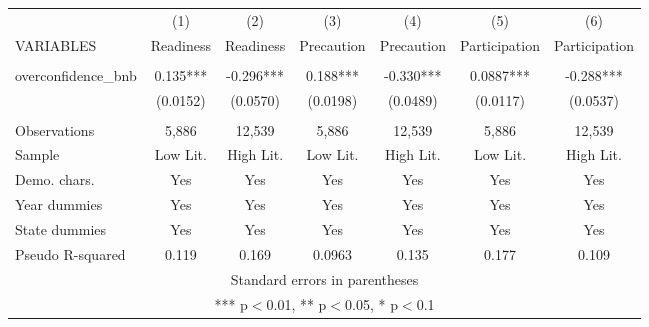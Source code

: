 \documentclass[]{article}
\begin{document}
\begin{tabular}{lcccccc} \hline
 & (1) & (2) & (3) & (4) & (5) & (6) \\
VARIABLES & Readiness & Readiness & Precaution & Precaution & Participation & Participation \\ \hline
 &  &  &  &  &  &  \\
overconfidence\_bnb & 0.135*** & -0.296*** & 0.188*** & -0.330*** & 0.0887*** & -0.288*** \\
 & (0.0152) & (0.0570) & (0.0198) & (0.0489) & (0.0117) & (0.0537) \\
 &  &  &  &  &  &  \\
Observations & 5,886 & 12,539 & 5,886 & 12,539 & 5,886 & 12,539 \\
Sample & Low Lit. & High Lit. & Low Lit. & High Lit. & Low Lit. & High Lit. \\
Demo. chars. & Yes & Yes & Yes & Yes & Yes & Yes \\
Year dummies & Yes & Yes & Yes & Yes & Yes & Yes \\
State dummies & Yes & Yes & Yes & Yes & Yes & Yes \\
 Pseudo R-squared & 0.119 & 0.169 & 0.0963 & 0.135 & 0.177 & 0.109 \\ \hline
\multicolumn{7}{c}{ Standard errors in parentheses} \\
\multicolumn{7}{c}{ *** p$<$0.01, ** p$<$0.05, * p$<$0.1} \\
\end{tabular}
\end{document}
